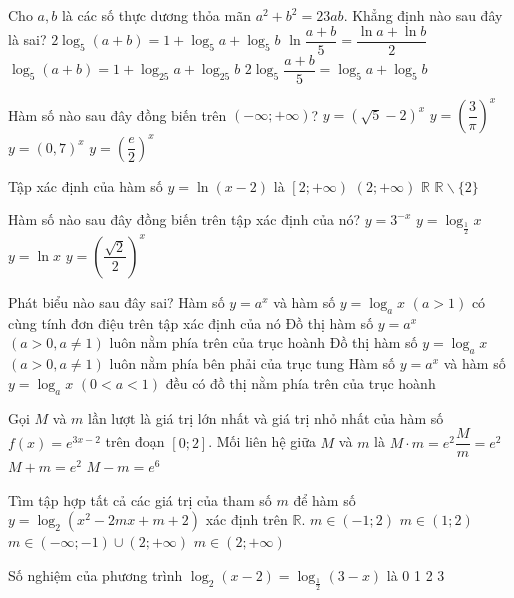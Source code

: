 \begin{ex}
	Cho $a,b$ là các số thực dương thỏa mãn $a^2+b^2=23ab$. Khẳng định nào sau đây là sai?
	\choice
	{$2\log _5(a+b)=1+\log _5a+\log _5b$}
	{$\ln \dfrac{a+b}{5}=\dfrac{\ln a+\ln b}{2}$}
	{$\log _5(a+b)=1+\log_{25}a+{{\log }_{25}}b$}
	{$2\log _5\dfrac{a+b}{5}=\log _5a+\log _5b$}
\end{ex}
\begin{ex}
	Hàm số nào sau đây đồng biến trên $\left(-\infty ;+\infty\right)$?
	\choice
	{$y=\left(\sqrt{5}-2\right)^x$}
	{$y={{\left(\dfrac{3}{\pi }\right)}^x}$}
	{$y={{\left(0{,}7\right)}^x}$}
	{$y={{\left(\dfrac{e}{2}\right)}^x}$}
\end{ex}
\begin{ex}
Tập xác định của hàm số $y=\ln (x-2)$ là
\choice
{$\left[2;+\infty\right)$}
{$\left(2;+\infty\right)$}
{$\mathbb{R}$}
{$\mathbb{R}\backslash \{2\}$}
\end{ex}
\begin{ex}
Hàm số nào sau đây đồng biến trên tập xác định của nó?
\choice
{$y={3^{-x}}$}
{$y={{\log }_{\tfrac{1}{2}}}x$}
{$y=\ln x$}
{$y={{\left(\dfrac{\sqrt{2}}{2}\right)}^x}$}
\end{ex}
\begin{ex}
Phát biểu nào sau đây sai?
\choice
{Hàm số $y=a^x$ và hàm số $y=\log _ax$ $\left(a>1\right)$ có cùng tính đơn điệu trên tập xác định của nó}
	{Đồ thị hàm số $y=a^x$ $\left(a>0,a\ne 1\right)$ luôn nằm phía trên của trục hoành}
	{Đồ thị hàm số $y=\log _ax$ $\left(a>0,a\ne 1\right)$ luôn nằm phía bên phải của trục tung}
	{Hàm số $y=a^x$ và hàm số $y=\log _ax$ $\left(0<a<1\right)$ đều có đồ thị nằm phía trên của trục hoành}
\end{ex}
\begin{ex}
	Gọi $M$ và $m$ lần lượt là giá trị lớn nhất và giá trị nhỏ nhất của hàm số $f(x)={e^{3x-2}}$ trên đoạn $[0;2]$. Mối liên hệ giữa $M$ và $m$ là
	\choice
	{$M \cdot m=e^2$}{$\dfrac{M}{m}=e^2$}{$M+m=e^2$}
	{$M-m=e^6$}
\end{ex}
\begin{ex}
	Tìm tập hợp tất cả các giá trị của tham số $m$ để hàm số $y=\log _2\left(x^2-2mx+m+2\right)$ xác định trên $\mathbb{R}$.
	\choice
	{$m\in (-1;2)$}
	{$m\in (1;2)$}
	{$m\in \left(-\infty ;-1\right)\cup \left(2;+\infty\right)$}
	{$m\in \left(2;+\infty\right)$}
\end{ex}
\begin{ex}
	Số nghiệm của phương trình $\log _2(x-2)=\log_{\tfrac{1}{2}}(3-x)$ là
	\choice
	{0}
	{1}
	{2}
	{3}
\end{ex}
